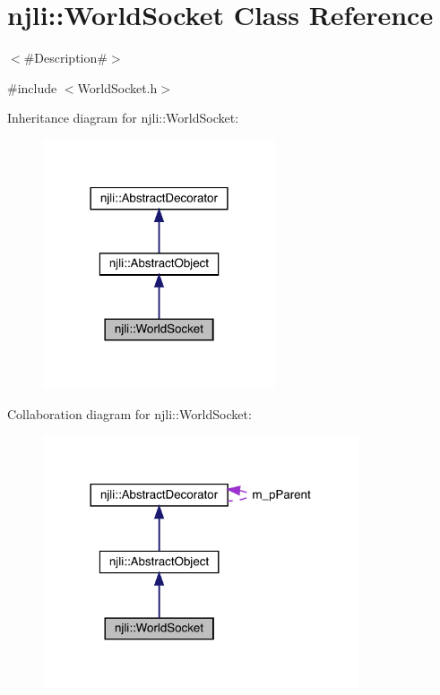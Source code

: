 \hypertarget{classnjli_1_1_world_socket}{}\section{njli\+:\+:World\+Socket Class Reference}
\label{classnjli_1_1_world_socket}


$<$\#\+Description\#$>$  




{\ttfamily \#include $<$World\+Socket.\+h$>$}



Inheritance diagram for njli\+:\+:World\+Socket\+:\nopagebreak
\begin{figure}[H]
\begin{center}
\leavevmode
\includegraphics[width=194pt]{classnjli_1_1_world_socket__inherit__graph}
\end{center}
\end{figure}


Collaboration diagram for njli\+:\+:World\+Socket\+:\nopagebreak
\begin{figure}[H]
\begin{center}
\leavevmode
\includegraphics[width=264pt]{classnjli_1_1_world_socket__coll__graph}
\end{center}
\end{figure}
